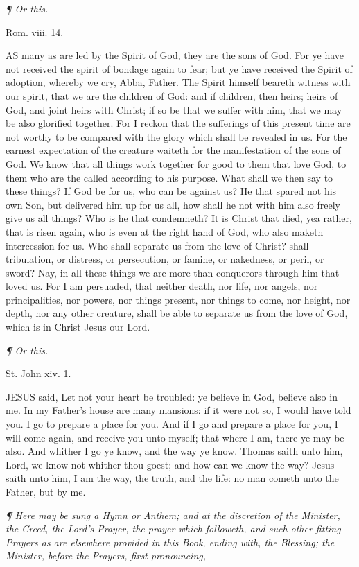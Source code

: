\emph{¶
Or this.}

Rom. viii.
14.

AS
many as are led by the Spirit of God, they are the sons of God. For ye
have not received the spirit of bondage again to fear; but ye have received
the Spirit of adoption, whereby we cry, Abba, Father. The Spirit himself
beareth witness with our spirit, that we are the children of God: and
if children, then heirs; heirs of God, and joint heirs with Christ; if
so be that we suffer with him, that we may be also glorified together.
For I reckon that the sufferings of this present time are not worthy to
be compared with the glory which shall be revealed in us. For the earnest
expectation of the creature waiteth for the manifestation of the sons
of God. We know that all things work together for good to them that love
God, to them who are the called according to his purpose. What shall we
then say to these things? If God be for us, who can be against us? He
that spared not his own Son, but delivered him up for us all, how shall
he not with him also freely give us all things? Who is he that condemneth?
It is Christ that died, yea rather, that is risen again, who is even at
the right hand of God, who also maketh intercession for us. Who shall
separate us from the love of Christ? shall tribulation, or distress, or
persecution, or famine, or nakedness, or peril, or sword? Nay, in all
these things we are more than conquerors through him that loved us. For
I am persuaded, that neither death, nor life, nor angels, nor principalities,
nor powers, nor things present, nor things to come, nor height, nor depth,
nor any other creature, shall be able to separate us from the love of
God, which is in Christ Jesus our Lord.

\emph{¶
Or this.}

St. John
xiv. 1.

JESUS
said, Let not your heart be troubled: ye believe in God, believe also
in me. In my Father's house are many mansions: if it were not so, I would
have told you. I go to prepare a place for you. And if I go and prepare
a place for you, I will come again, and receive you unto myself; that
where I am, there ye may be also. And whither I go ye know, and the way
ye know. Thomas saith unto him, Lord, we know not whither thou goest;
and how can we know the way? Jesus saith unto him, I am the way, the truth,
and the life: no man cometh unto the Father, but by me.

\emph{¶
Here may be sung a Hymn or Anthem; and at the discretion of the Minister,
the Creed, the Lord’s Prayer, the prayer which followeth,
and such other fitting Prayers as are elsewhere provided in this Book,
ending with, the Blessing; the Minister, before the Prayers, first pronouncing,}

